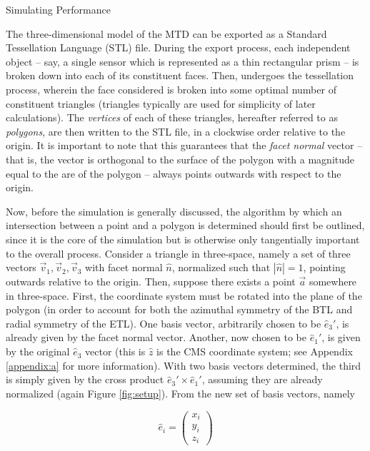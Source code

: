 \begin{section}{Simulating Performance}

The three-dimensional model of the MTD can be exported as a Standard Tessellation Language (STL) file. During the export process, each independent object -- say, a single sensor which is represented as a thin rectangular prism -- is broken down into each of its constituent faces. Then, undergoes the tessellation process, wherein the face considered is broken into some optimal number of constituent triangles (triangles typically are used for simplicity of later calculations). The \textit{vertices} of each of these triangles, hereafter referred to as \textit{polygons}, are then written to the STL file, in a clockwise order relative to the origin. It is important to note that this guarantees that the \textit{facet normal} vector -- that is, the vector is orthogonal to the surface of the polygon with a magnitude equal to the are of the polygon -- always points outwards with respect to the origin.

Now, before the simulation is generally discussed, the algorithm by which an intersection between a point and a polygon is determined should first be outlined, since it is the core of the simulation but is otherwise only tangentially important to the overall process. Consider a triangle in three-space, namely a set of three vectors $\vec{v}_1, \vec{v}_2, \vec{v}_3$ with facet normal $\hat{n}$, normalized such that $|\hat{n}| = 1$, pointing outwards relative to the origin. Then, suppose there exists a point $\vec{a}$ somewhere in three-space. First, the coordinate system must be rotated into the plane of the polygon (in order to account for both the azimuthal symmetry of the BTL and radial symmetry of the ETL). One basis vector, arbitrarily chosen to be $\hat{e}_3'$, is already given by the facet normal vector. Another, now chosen to be $\hat{e}_{1}'$, is given by the original $\hat{e}_3$ vector (this is $\hat{z}$ is the CMS coordinate system; see Appendix \ref{appendix:a} for more information). With two basis vectors determined, the third is simply given by the cross product $\hat{e}_3'\times\hat{e}_1'$, assuming they are already normalized (again Figure \ref{fig:setup}). From the new set of basis vectors, namely

\begin{equation}
    \hat{e}_i = \begin{pmatrix} x_i \\ y_i \\ z_i \end{pmatrix}
\end{equation}


\end{section}
